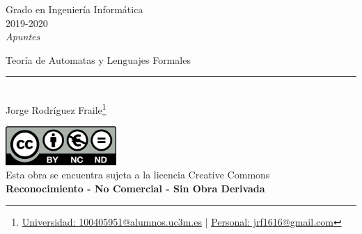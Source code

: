\documentclass[12pt, twoside, openright]{report} %
\begin{document}

\begin{titlepage}
	\begin{sffamily}
		\color{azulUC3M}
		\begin{center}
			\begin{figure}[H] %
			\end{figure}
			\vspace{2.5cm}
			\begin{Large}
				Grado en Ingeniería Informática\\
				2019-2020\\
				\vspace{2cm}
				\textsl{Apuntes}\\
				\bigskip
			\end{Large}
			{\Huge Teoría de Automatas y Lenguajes Formales}\\
			\vspace*{0.5cm}
			\rule{10.5cm}{0.1mm}\\
			\vspace*{0.9cm}
			{\LARGE Jorge Rodríguez Fraile\footnote{\href{mailto:100405951@alumnos.uc3m.es}{Universidad: 100405951@alumnos.uc3m.es}  |  \href{mailto:jrf1616@gmail.com}{Personal: jrf1616@gmail.com}}}\\
			\vspace*{1cm}
		\end{center}
		\vfill
		\color{black}
		\includegraphics[width=4.2cm]{img/creativecommons.png}\\
		Esta obra se encuentra sujeta a la licencia Creative Commons\\ \textbf{Reconocimiento - No Comercial - Sin Obra Derivada}
	\end{sffamily}
\end{titlepage}


\tableofcontents
\thispagestyle{fancy}
\end{document}
